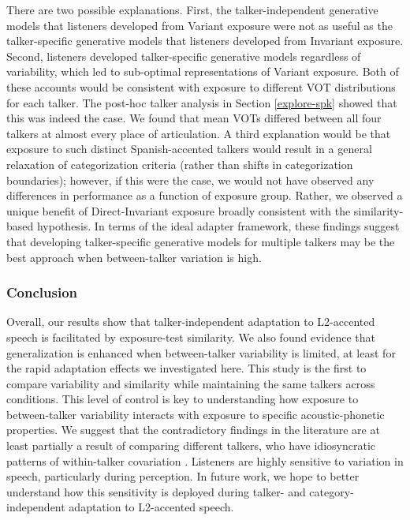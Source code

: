 \documentclass[preprint, 3p, authoryear]{elsarticle} %
\begin{document}
There are two possible explanations.
First, the talker-independent generative models that listeners developed from Variant exposure were not as useful as the talker-specific generative models that listeners developed from Invariant exposure.
Second, listeners developed talker-specific generative models regardless of variability, which led to sub-optimal representations of Variant exposure.
Both of these accounts would be consistent with exposure to different VOT distributions for each talker.
The post-hoc talker analysis in Section \ref{explore-spk} showed that this was indeed the case.
We found that mean VOTs differed between all four talkers at almost every place of articulation.
A third explanation would be that exposure to such distinct Spanish-accented talkers would result in a general relaxation of categorization criteria (rather than shifts in categorization boundaries); however, if this were the case, we would not have observed any differences in performance as a function of exposure group.
Rather, we observed a unique benefit of Direct-Invariant exposure broadly consistent with the similarity-based hypothesis.
In terms of the ideal adapter framework, these findings suggest that developing talker-specific generative models for multiple talkers may be the best approach when between-talker variation is high.

\hypertarget{conclusion}{%
\subsubsection{Conclusion}\label{conclusion}}

Overall, our results show that talker-independent adaptation to L2-accented speech is facilitated by exposure-test similarity.
We also found evidence that generalization is enhanced when between-talker variability is limited, at least for the rapid adaptation effects we investigated here.
This study is the first to compare variability and similarity while maintaining the same talkers across conditions.
This level of control is key to understanding how exposure to between-talker variability interacts with exposure to specific acoustic-phonetic properties.
We suggest that the contradictory findings in the literature are at least partially a result of comparing different talkers, who have idiosyncratic patterns of within-talker covariation \citep{clayards2017, whalen2018, xie2020}.
Listeners are highly sensitive to variation in speech, particularly during perception.
In future work, we hope to better understand how this sensitivity is deployed during talker- and category-independent adaptation to L2-accented speech.


\end{document}
